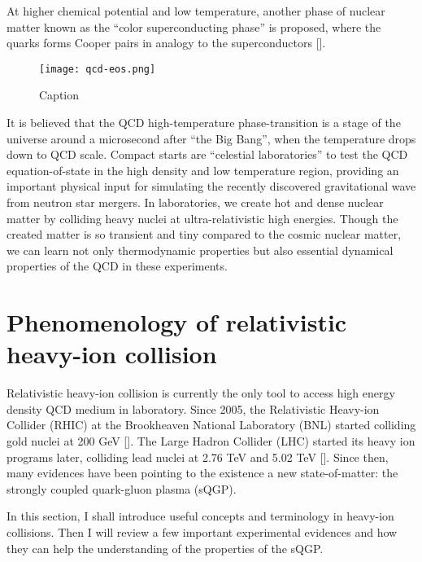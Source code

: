 At higher chemical potential and low temperature, another phase of nuclear matter known as the ``color superconducting phase'' is proposed, where the quarks forms Cooper pairs in analogy to the superconductors [].

\begin{figure}
    \centering
    \texttt{[image: qcd-eos.png]}
    \caption{Caption}
    \label{fig:qcd_eos}
\end{figure}

It is believed that the QCD high-temperature phase-transition is a stage of the universe around a microsecond after ``the Big Bang'', when the temperature drops down to QCD scale.
Compact starts are ``celestial laboratories'' to test the QCD equation-of-state in the high density and low temperature region, providing an important physical input for simulating the recently discovered gravitational wave from neutron star mergers.
In laboratories, we create hot and dense nuclear matter by colliding heavy nuclei at ultra-relativistic high energies.
Though the created matter is so transient and tiny compared to the cosmic nuclear matter, we can learn not only thermodynamic properties but also essential dynamical properties of the QCD in these experiments.

\section{Phenomenology of relativistic heavy-ion collision}
Relativistic heavy-ion collision is currently the only tool to access high energy density QCD medium in laboratory.
Since 2005, the Relativistic Heavy-ion Collider (RHIC) at the Brookheaven National Laboratory (BNL) started colliding gold nuclei at 200 GeV []. 
The Large Hadron Collider (LHC) started its heavy ion programs later, colliding lead nuclei at 2.76 TeV and 5.02 TeV [].
Since then, many evidences have been pointing to the existence a new state-of-matter: the strongly coupled quark-gluon plasma (sQGP).

In this section, I shall introduce useful concepts and terminology in heavy-ion collisions.
Then I will review a few important experimental evidences and how they can help the understanding of the properties of the sQGP.

